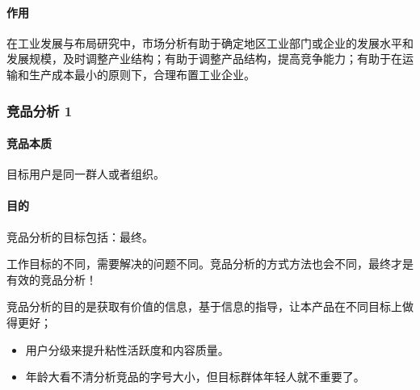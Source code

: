 \documentclass[letterpaper,11pt,english]{sphinxmanual}
\begin{document}
\paragraph{作用}
\label{\detokenize{chapter_knowledge/market_analysis:id5}}
在工业发展与布局研究中，市场分析有助于确定地区工业部门或企业的发展水平和发展规模，及时调整产业结构；有助于调整产品结构，提高竞争能力；有助于在运输和生产成本最小的原则下，合理布置工业企业。


\subsubsection{竞品分析 1\sphinxfootnotemark[444]}
\label{\detokenize{chapter_knowledge/goods_analysis:id1}}\label{\detokenize{chapter_knowledge/goods_analysis::doc}}%
\begin{footnotetext}[444]\sphinxAtStartFootnote
{}
%
\end{footnotetext}\ignorespaces 

\paragraph{竞品本质}
\label{\detokenize{chapter_knowledge/goods_analysis:id2}}
目标用户是同一群人或者组织。%
\begin{footnote}[445]\sphinxAtStartFootnote
{}
%
\end{footnote}


\paragraph{目的}
\label{\detokenize{chapter_knowledge/goods_analysis:id3}}
竞品分析的目标包括：最终。%
\begin{footnote}[446]\sphinxAtStartFootnote
{}
%
\end{footnote}
工作目标的不同，需要解决的问题不同。竞品分析的方式方法也会不同，最终才是有效的竞品分析！

竞品分析的目的是获取有价值的信息，基于信息的指导，让本产品在不同目标上做得更好；
\begin{itemize}
\item {} 
用户分级来提升粘性活跃度和内容质量。

\item {} 
年龄大看不清分析竞品的字号大小，但目标群体年轻人就不重要了。

\end{itemize}
\end{document}
